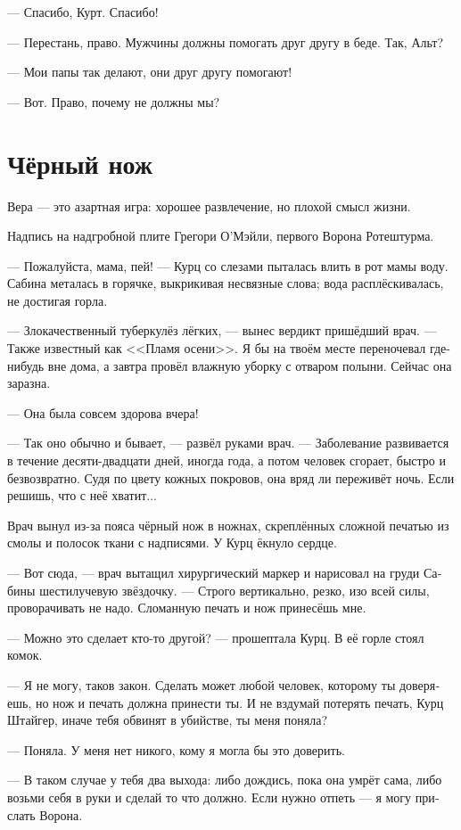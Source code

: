 \documentclass[a4paper,12pt,fleqn]{book}\usepackage{polyglossia}\setdefaultlanguage[babelshorthands=true]{russian}\setotherlanguage{english}\defaultfontfeatures{Ligatures=TeX,Mapping=tex-text}\usepackage{xcolor}\newcommand{\ml}[3]{#2}
\begin{document}
--- Спасибо, Курт.
Спасибо!

--- Перестань, право.
Мужчины должны помогать друг другу в беде.
Так, Альт?

--- Мои папы так делают, они друг другу помогают!

--- Вот.
Право, почему не должны мы?

\section{Чёрный нож}

\epigraph
{Вера --- это азартная игра: хорошее развлечение, но плохой смысл жизни.}
{Надпись на надгробной плите Грегори О'Мэйли, первого Ворона Ротештурма.}

--- Пожалуйста, мама, пей! --- Курц со слезами пыталась влить в рот мамы воду.
Сабина металась в горячке, выкрикивая несвязные слова;
вода расплёскивалась, не достигая горла.

--- Злокачественный туберкулёз лёгких, --- вынес вердикт пришёдший врач.
--- Также известный как <<Пламя осени>>.
Я бы на твоём месте переночевал где-нибудь вне дома, а завтра провёл влажную уборку с отваром полыни.
Сейчас она заразна.

--- Она была совсем здорова вчера!

--- Так оно обычно и бывает, --- развёл руками врач.
--- Заболевание развивается в течение десяти-двадцати дней, иногда года, а потом человек сгорает, быстро и безвозвратно.
Судя по цвету кожных покровов, она вряд ли переживёт ночь.
Если решишь, что с неё хватит...

Врач вынул из-за пояса чёрный нож в ножнах, скреплённых сложной печатью из смолы и полосок ткани с надписями.
У Курц ёкнуло сердце.

--- Вот сюда, --- врач вытащил хирургический маркер и нарисовал на груди Сабины шестилучевую звёздочку.
--- Строго вертикально, резко, изо всей силы, проворачивать не надо.
Сломанную печать и нож принесёшь мне.

--- Можно это сделает кто-то другой? --- прошептала Курц.
В её горле стоял комок.

--- Я не могу, таков закон.
Сделать может любой человек, которому ты доверяешь, но нож и печать должна принести ты.
И не вздумай потерять печать, Курц Штайгер, иначе тебя обвинят в убийстве, ты меня поняла?

--- Поняла.
У меня нет никого, кому я могла бы это доверить.

--- В таком случае у тебя два выхода: либо дождись, пока она умрёт сама, либо возьми себя в руки и сделай то что должно.
\ml{$0$}
{Если нужно отпеть --- я могу прислать Ворона.}
{If she needs last rites, I'll send the Raben.''}
\end{document}
